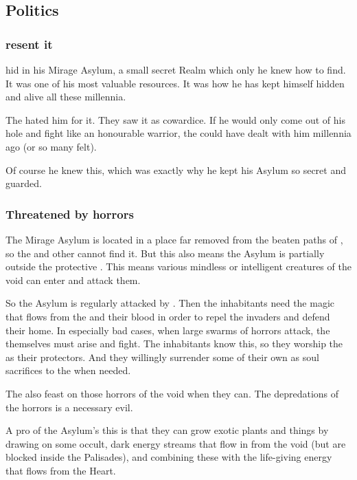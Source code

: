 \subsection{Politics}





\subsubsection{\Resphain resent it}
\Ishnaruchaefir hid in his Mirage Asylum, a small secret Realm which only he knew how to find.
It was one of his most valuable resources.
It was how he has kept himself hidden and alive all these millennia.

The \resphain hated him for it. 
They saw it as cowardice. 
If he would only come out of his hole and fight like an honourable warrior, the \resphain could have dealt with him millennia ago (or so many felt). 

Of course he knew this, which was exactly why he kept his Asylum so secret and guarded.





\subsubsection{Threatened by horrors}
The Mirage Asylum is located in a place far removed from the beaten paths of \Miith, so the \resphain and other \Miithians cannot find it.
But this also means the Asylum is partially outside the protective .
This means various mindless or intelligent creatures of the void can enter and attack them.

So the Asylum is regularly attacked by .
Then the inhabitants need the magic that flows from the \dragons and their blood in order to repel the invaders and defend their home.
In especially bad cases, when large swarms of horrors attack, the \dragons themselves must arise and fight.
The inhabitants know this, so they worship the \dragons as their protectors.
And they willingly surrender some of their own as soul sacrifices to the \dragons when needed. 

The \dragons also feast on those horrors of the void when they can.
The depredations of the horrors is a necessary evil.

A pro of the Asylum's this is that they can grow exotic plants and things by drawing on some occult, dark energy streams that flow in from the void (but are blocked inside the Palisades), and combining these with the life-giving energy that flows from the Heart.










